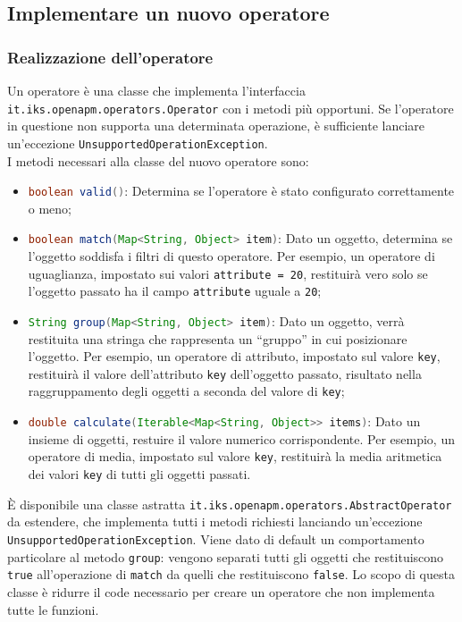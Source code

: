 \subsection{Implementare un nuovo operatore}
\label{newoperatore}
	\subsubsection{Realizzazione dell'operatore}
		
		Un operatore è una classe che implementa l'interfaccia \lstinline{it.iks.openapm.operators.Operator}
		con i metodi più opportuni.
		Se l'operatore in questione non supporta una determinata operazione, 
		è sufficiente lanciare un'eccezione \lstinline{UnsupportedOperationException}.\\
		I metodi necessari alla classe del nuovo operatore sono:

		\begin{itemize}
			\item \lstinline[language=Java]{boolean valid()}:
				Determina se l'operatore è stato configurato correttamente o meno;

			\item \lstinline[language=Java]{boolean match(Map<String, Object> item)}:
				Dato un oggetto, determina se l'oggetto soddisfa i filtri di questo operatore.
				Per esempio, un operatore di uguaglianza, impostato sui valori \lstinline{attribute = 20}, 
				restituirà vero solo se l'oggetto passato ha il campo \lstinline{attribute} uguale a \lstinline{20};

			\item \lstinline[language=Java]{String group(Map<String, Object> item)}:
				Dato un oggetto, verrà restituita una stringa che rappresenta un ``gruppo'' in cui 
				posizionare l'oggetto.
				Per esempio, un operatore di attributo, impostato sul valore \lstinline{key}, 
				restituirà il valore dell'attributo \lstinline{key} dell'oggetto passato,
				risultato nella raggruppamento degli oggetti a seconda del valore di \lstinline{key};

			\item \lstinline[language=Java]{double calculate(Iterable<Map<String, Object>> items)}:
				Dato un insieme di oggetti, restuire il valore numerico corrispondente.
				Per esempio, un operatore di media, impostato sul valore \lstinline{key}, restituirà 
				la media aritmetica dei valori \lstinline{key} di tutti gli oggetti passati.

		\end{itemize}
		È disponibile una classe astratta \lstinline{it.iks.openapm.operators.AbstractOperator} da estendere,
		che implementa tutti i metodi richiesti lanciando un'eccezione \lstinline{UnsupportedOperationException}. 
		Viene dato di default un comportamento particolare al metodo \lstinline{group}: vengono separati tutti 
		gli oggetti che restituiscono \lstinline{true} all'operazione di \lstinline{match} da quelli che 
		restituiscono \lstinline{false}.
		Lo scopo di questa classe è ridurre il  code necessario per creare un operatore che non 
		implementa tutte le funzioni.


